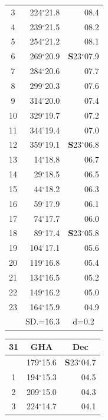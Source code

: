 \documentclass[10pt, a4paper]{report}
\begin{document}
\begin{scriptsize}
\begin{tabular*}{0.2\textwidth}[t]{@{\extracolsep{\fill}}|c|rr|}
3 & 224$^\circ$21.8 & \raisebox{0.24ex}{\boldmath$\cdot$~\boldmath$\cdot$~~}08.4\\
4 & 239$^\circ$21.5 & 08.2\\
5 & 254$^\circ$21.2 & 08.1\\[2Pt]
6 & 269$^\circ$20.9 & \textbf{S}23$^\circ$07.9\\
7 & 284$^\circ$20.6 & 07.7\\
8 & 299$^\circ$20.3 & 07.6\\
9 & 314$^\circ$20.0 & \raisebox{0.24ex}{\boldmath$\cdot$~\boldmath$\cdot$~~}07.4\\
10 & 329$^\circ$19.7 & 07.2\\
11 & 344$^\circ$19.4 & 07.0\\[2Pt]
12 & 359$^\circ$19.1 & \textbf{S}23$^\circ$06.8\\
13 & 14$^\circ$18.8 & 06.7\\
14 & 29$^\circ$18.5 & 06.5\\
15 & 44$^\circ$18.2 & \raisebox{0.24ex}{\boldmath$\cdot$~\boldmath$\cdot$~~}06.3\\
16 & 59$^\circ$17.9 & 06.1\\
17 & 74$^\circ$17.7 & 06.0\\[2Pt]
18 & 89$^\circ$17.4 & \textbf{S}23$^\circ$05.8\\
19 & 104$^\circ$17.1 & 05.6\\
20 & 119$^\circ$16.8 & 05.4\\
21 & 134$^\circ$16.5 & \raisebox{0.24ex}{\boldmath$\cdot$~\boldmath$\cdot$~~}05.2\\
22 & 149$^\circ$16.2 & 05.0\\
23 & 164$^\circ$15.9 & 04.9\\
\hline
\rule{0pt}{2.4ex} & \multicolumn{1}{c}{SD.=16.3} & \multicolumn{1}{c|}{d=0.2}\\
\hline
\end{tabular*}\noindent
\begin{tabular*}{0.2\textwidth}[t]{@{\extracolsep{\fill}}|c|rr|}
\hline
\multicolumn{1}{|c|}{\rule{0pt}{2.6ex}\textbf{31}} & \multicolumn{1}{c}{\textbf{GHA}} & \multicolumn{1}{c|}{\textbf{Dec}}\\
\hline\rule{0pt}{2.6ex}\noindent
0 & 179$^\circ$15.6 & \textbf{S}23$^\circ$04.7\\
1 & 194$^\circ$15.3 & 04.5\\
2 & 209$^\circ$15.0 & 04.3\\
3 & 224$^\circ$14.7 & \raisebox{0.24ex}{\boldmath$\cdot$~\boldmath$\cdot$~~}04.1\\

\end{tabular*}
\end{scriptsize}
\end{document}
